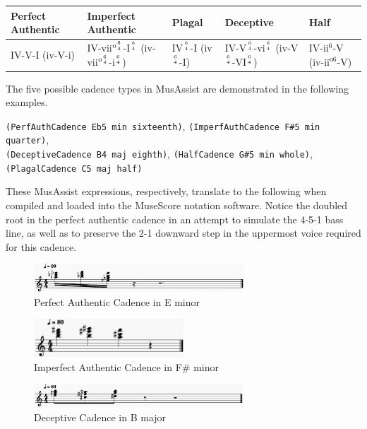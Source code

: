 \documentclass{report}
\begin{document}
\begin{table}[h!]
\begin{tabular}{|l|l|l|l|l|}
\hline
Perfect Authentic & Imperfect Authentic & Plagal & Deceptive & Half \\ \hline
IV-V-I (iv-V-i) 
& IV-vii$^{\text{o}{6 \atop 4}}$-I$^{6 \atop 4}$ (iv-vii$^{\text{o}{6 \atop 4}}$-i$^{6 \atop 4}$)
& IV$^{6 \atop 4}$-I (iv$^{6 \atop 4}$-I)        
& IV-V$^{6 \atop 4}$-vi$^{6 \atop 4}$ (iv-V$^{6 \atop 4}$-VI$^{6 \atop 4}$)
& IV-ii$^6$-V (iv-ii$^{\text{o}6}$-V)
\\ \hline
\end{tabular}
\label{table:cadences}
\end{table}

The five possible cadence types in MusAssist are demonstrated in the following examples. 

\noindent\verb.(PerfAuthCadence Eb5 min sixteenth)., \verb.(ImperfAuthCadence F#5 min quarter)., \\\verb.(DeceptiveCadence B4 maj eighth)., \verb.(HalfCadence G#5 min whole)., \verb.(PlagalCadence C5 maj half).

These MusAssist expressions,  respectively, translate to the following when  compiled and loaded into the MuseScore notation software. Notice the doubled root in the perfect authentic cadence in an attempt to simulate the 4-5-1 bass line, as well as to preserve the 2-1 downward step in the uppermost voice required for this cadence. 
\begin{figure}[h!]
\centering
\includegraphics[width=0.7\textwidth]{images/perfauth}
  \caption{Perfect Authentic Cadence in E\musFlat\; minor}
\end{figure}

\begin{figure}[h!]
\centering
\includegraphics[width=0.5\textwidth]{images/imperfauth}
  \caption{Imperfect Authentic Cadence in F\# minor}
\end{figure}

\begin{figure}[h!]
\centering
\includegraphics[width=0.7\textwidth]{images/deceptive}
  \caption{Deceptive Cadence in B major}
\end{figure}
\end{document}
